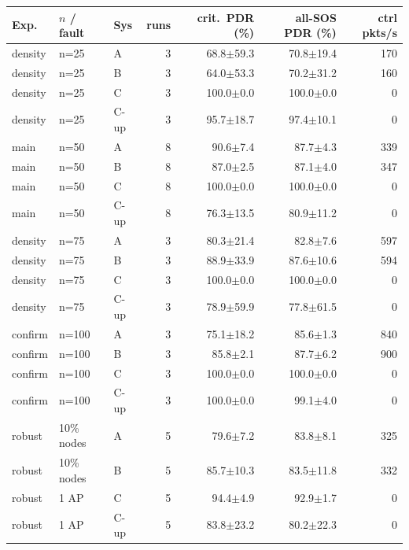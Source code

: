 \begin{tabular}{@{}lllrrrr@{}}\toprule
Exp. & $n$ / fault & Sys & runs & crit.\ PDR (\%) & all-SOS PDR (\%) & ctrl pkts/s\\\midrule
density & n=25 & A & 3 & 68.8$\pm$59.3 & 70.8$\pm$19.4 & 170\\
density & n=25 & B & 3 & 64.0$\pm$53.3 & 70.2$\pm$31.2 & 160\\
density & n=25 & C & 3 & 100.0$\pm$0.0 & 100.0$\pm$0.0 & 0\\
density & n=25 & C-up & 3 & 95.7$\pm$18.7 & 97.4$\pm$10.1 & 0\\
\midrule
main & n=50 & A & 8 & 90.6$\pm$7.4 & 87.7$\pm$4.3 & 339\\
main & n=50 & B & 8 & 87.0$\pm$2.5 & 87.1$\pm$4.0 & 347\\
main & n=50 & C & 8 & 100.0$\pm$0.0 & 100.0$\pm$0.0 & 0\\
main & n=50 & C-up & 8 & 76.3$\pm$13.5 & 80.9$\pm$11.2 & 0\\
\midrule
density & n=75 & A & 3 & 80.3$\pm$21.4 & 82.8$\pm$7.6 & 597\\
density & n=75 & B & 3 & 88.9$\pm$33.9 & 87.6$\pm$10.6 & 594\\
density & n=75 & C & 3 & 100.0$\pm$0.0 & 100.0$\pm$0.0 & 0\\
density & n=75 & C-up & 3 & 78.9$\pm$59.9 & 77.8$\pm$61.5 & 0\\
\midrule
confirm & n=100 & A & 3 & 75.1$\pm$18.2 & 85.6$\pm$1.3 & 840\\
confirm & n=100 & B & 3 & 85.8$\pm$2.1 & 87.7$\pm$6.2 & 900\\
confirm & n=100 & C & 3 & 100.0$\pm$0.0 & 100.0$\pm$0.0 & 0\\
confirm & n=100 & C-up & 3 & 100.0$\pm$0.0 & 99.1$\pm$4.0 & 0\\
\midrule
robust & 10\% nodes & A & 5 & 79.6$\pm$7.2 & 83.8$\pm$8.1 & 325\\
robust & 10\% nodes & B & 5 & 85.7$\pm$10.3 & 83.5$\pm$11.8 & 332\\
robust & 1 AP & C & 5 & 94.4$\pm$4.9 & 92.9$\pm$1.7 & 0\\
robust & 1 AP & C-up & 5 & 83.8$\pm$23.2 & 80.2$\pm$22.3 & 0\\
\bottomrule\end{tabular}